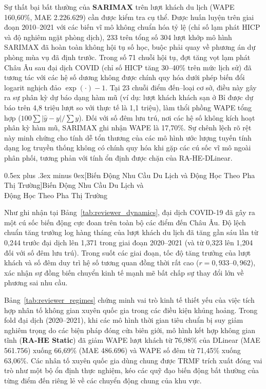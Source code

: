 \documentclass[10pt,journal,compsoc]{IEEEtran}
\makeatletter
\def\subsection{\@startsection{subsection}{2}{\z@}{-1.8ex plus -0.6ex minus -0.3ex}%
{0.5ex plus .3ex minus 0ex}{\normalfont\normalsize\rmfamily\bfseries}}
\makeatother
\begin{document}
Sự thất bại bất thường của \textbf{SARIMAX} trên lượt khách du lịch (WAPE 160,60\%, MAE 2.226.629) cần được kiểm tra cụ thể. Được huấn luyện trên giai đoạn 2010--2021 với các biến vĩ mô không chuẩn hóa tỷ lệ (chỉ số lạm phát HICP và độ nghiêm ngặt phòng dịch), 233 trên tổng số 304 lượt khớp mô hình SARIMAX đã hoàn toàn không hội tụ số học, buộc phải quay về phương án dự phòng mùa vụ đã định trước. Trong số 71 chuỗi hội tụ, đợt tăng vọt lạm phát Châu Âu sau đại dịch COVID (chỉ số HICP tăng 30--40\% trên mức lịch sử) đã tương tác với các hệ số dương không được chính quy hóa dưới phép biến đổi logarit nghịch đảo $\exp(\cdot)-1$. Tại 23 chuỗi điểm đến--loại cơ sở, điều này gây ra sự phân kỳ dự báo dạng hàm mũ (ví dụ: lượt khách khách sạn ở Bỉ được dự báo trên 4,8 triệu lượt so với thực tế là 1,1 triệu), làm thổi phồng WAPE tổng hợp ($100\sum|\hat{y}-y|/\sum y$). Đối với số đêm lưu trú, nơi các hệ số không kích hoạt phân kỳ hàm mũ, SARIMAX ghi nhận WAPE là 17,70\%. Sự chênh lệch rõ rệt này minh chứng cho tính dễ tổn thương của các mô hình ước lượng tuyến tính dạng log truyền thống không có chính quy hóa khi gặp các cú sốc vĩ mô ngoài phân phối, tương phản với tính ổn định được chặn của RA-HE-DLinear.

\subsection[Biến Động Nhu Cầu Du Lịch và Động Học Theo Pha Thị Trường]{Biến Động Nhu Cầu Du Lịch và\\Động Học Theo Pha Thị Trường}
\label{sec:market_dynamics}




Như ghi nhận tại Bảng~\ref{tab:reviewer_dynamics}, đại dịch COVID-19 đã gây ra một cú sốc biến động cực đoan trên toàn bộ các điểm đến Châu Âu. Độ lệch chuẩn tăng trưởng log hàng tháng của lượt khách du lịch đã tăng gần sáu lần từ 0,244 trước đại dịch lên 1,371 trong giai đoạn 2020--2021 (và từ 0,323 lên 1,204 đối với số đêm lưu trú). Trong suốt các giai đoạn, tốc độ tăng trưởng của lượt khách và số đêm duy trì hệ số tương quan đồng thời rất cao ($r = 0{,}933$--$0{,}962$), xác nhận sự đồng biến chuyển kinh tế mạnh mẽ bất chấp sự thay đổi lớn về phương sai nhu cầu.

Bảng~\ref{tab:reviewer_regimes} chứng minh vai trò kinh tế thiết yếu của việc tích hợp nhân tố không gian xuyên quốc gia trong các điều kiện khủng hoảng. Trong fold đại dịch (2020--2021), khi các mô hình thời gian tiêu chuẩn bị suy giảm nghiêm trọng do các biện pháp đóng cửa biên giới, mô hình kết hợp không gian tĩnh (\textbf{RA-HE Static}) đã giảm WAPE lượt khách từ 76,98\% của DLinear (MAE 561.756) xuống 66,69\% (MAE 486.696) và WAPE số đêm từ 71,45\% xuống 63,06\%. Các nhân tố xuyên quốc gia dùng chung được TRMF trích xuất đóng vai trò như một bộ ổn định thực nghiệm, kéo các quỹ đạo biến động bất thường của từng điểm đến riêng lẻ về các chuyển động chung của khu vực.
\end{document}

